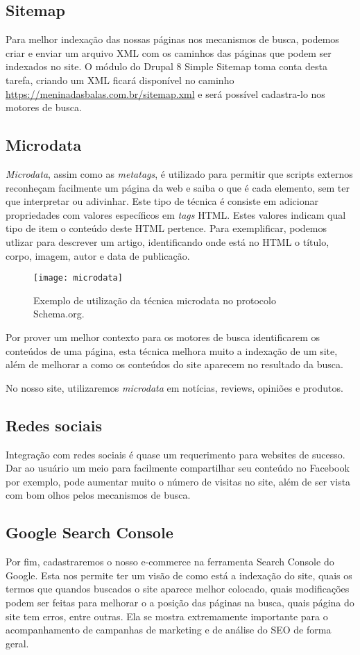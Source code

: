 \subsection{Sitemap}
Para melhor indexação das nossas páginas nos mecanismos de busca, podemos criar e enviar um arquivo XML com os caminhos das páginas que podem ser indexados no site. O módulo do Drupal 8 Simple Sitemap toma conta desta tarefa, criando um XML ficará disponível no caminho \url{https://meninadasbalas.com.br/sitemap.xml} e será possível cadastra-lo nos motores de busca.

\subsection{Microdata}
\textit{Microdata}, assim como as \textit{metatags}, é utilizado para permitir que scripts externos reconheçam facilmente um página da web e saiba o que é cada elemento, sem ter que interpretar ou adivinhar. Este tipo de técnica é consiste em adicionar propriedades com valores específicos em \textit{tags} HTML. Estes valores indicam qual tipo de item o conteúdo deste HTML pertence. Para exemplificar, podemos utlizar para descrever um artigo, identificando onde está no HTML o título, corpo, imagem, autor e data de publicação.

\begin{figure}[ht]
  \centering
  \texttt{[image: microdata]}
  \caption{Exemplo de utilização da técnica microdata no protocolo Schema.org.}
  \label{microdata}
\end{figure}

Por prover um melhor contexto para os motores de busca identificarem os conteúdos de uma página, esta técnica melhora muito a indexação de um site, além de melhorar a como os conteúdos do site aparecem no resultado da busca\cite{Microdata}.

No nosso site, utilizaremos \textit{microdata} em notícias, reviews, opiniões e produtos.

\subsection{Redes sociais}
Integração com redes sociais é quase um requerimento para websites de sucesso. Dar ao usuário um meio para facilmente compartilhar seu conteúdo no Facebook por exemplo, pode aumentar muito o número de visitas no site, além de ser vista com bom olhos pelos mecanismos de busca.

\subsection{Google Search Console}
Por fim, cadastraremos o nosso e-commerce na ferramenta Search Console do Google. Esta nos permite ter um visão de como está a indexação do site, quais os termos que quandos buscados o site aparece melhor colocado, quais modificações podem ser feitas para melhorar o a posição das páginas na busca, quais página do site tem erros, entre outras. Ela se mostra extremamente importante para o acompanhamento de campanhas de marketing e de análise do SEO de forma geral.

